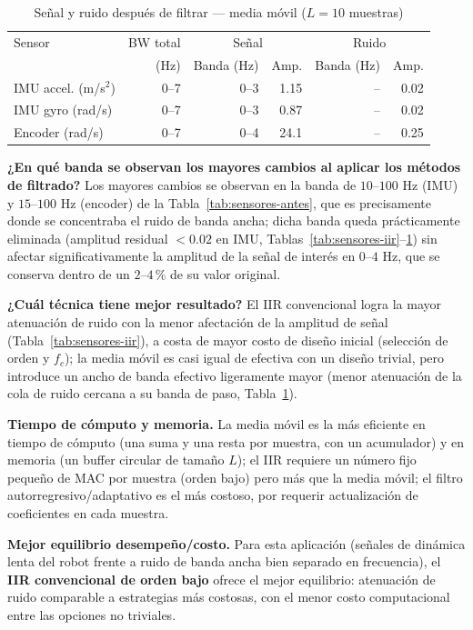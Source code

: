 \begin{table}[!t]
\centering
\caption{Señal y ruido después de filtrar — media móvil ($L=10$ muestras)}
\label{tab:sensores-ma}
\small
\begin{tabular}{@{}l r r r r r@{}}
\toprule
Sensor & BW total & \multicolumn{2}{c}{Señal} & \multicolumn{2}{c}{Ruido} \\
 & (Hz) & Banda (Hz) & Amp. & Banda (Hz) & Amp. \\
\midrule
IMU accel. (m/s$^2$) & 0--7 & 0--3 & 1.15 & -- & 0.02 \\
IMU gyro (rad/s)     & 0--7 & 0--3 & 0.87 & -- & 0.02 \\
Encoder (rad/s)      & 0--7 & 0--4 & 24.1 & -- & 0.25 \\
\bottomrule
\end{tabular}
\end{table}

\textbf{¿En qué banda se observan los mayores cambios al aplicar los métodos de filtrado?} Los mayores cambios se observan en la banda de $10$--$100$ Hz (IMU) y $15$--$100$ Hz (encoder) de la Tabla~\ref{tab:sensores-antes}, que es precisamente donde se concentraba el ruido de banda ancha; dicha banda queda prácticamente eliminada (amplitud residual $< 0.02$ en IMU, Tablas~\ref{tab:sensores-iir}--\ref{tab:sensores-ma}) sin afectar significativamente la amplitud de la señal de interés en $0$--$4$ Hz, que se conserva dentro de un $2$--$4\,\%$ de su valor original.

\textbf{¿Cuál técnica tiene mejor resultado?} El IIR convencional logra la mayor atenuación de ruido con la menor afectación de la amplitud de señal (Tabla~\ref{tab:sensores-iir}), a costa de mayor costo de diseño inicial (selección de orden y $f_c$); la media móvil es casi igual de efectiva con un diseño trivial, pero introduce un ancho de banda efectivo ligeramente mayor (menor atenuación de la cola de ruido cercana a su banda de paso, Tabla~\ref{tab:sensores-ma}).

\textbf{Tiempo de cómputo y memoria.} La media móvil es la más eficiente en tiempo de cómputo (una suma y una resta por muestra, con un acumulador) y en memoria (un buffer circular de tamaño $L$); el IIR requiere un número fijo pequeño de MAC por muestra (orden bajo) pero más que la media móvil; el filtro autorregresivo/adaptativo es el más costoso, por requerir actualización de coeficientes en cada muestra.

\textbf{Mejor equilibrio desempeño/costo.} Para esta aplicación (señales de dinámica lenta del robot frente a ruido de banda ancha bien separado en frecuencia), el \textbf{IIR convencional de orden bajo} ofrece el mejor equilibrio: atenuación de ruido comparable a estrategias más costosas, con el menor costo computacional entre las opciones no triviales.

